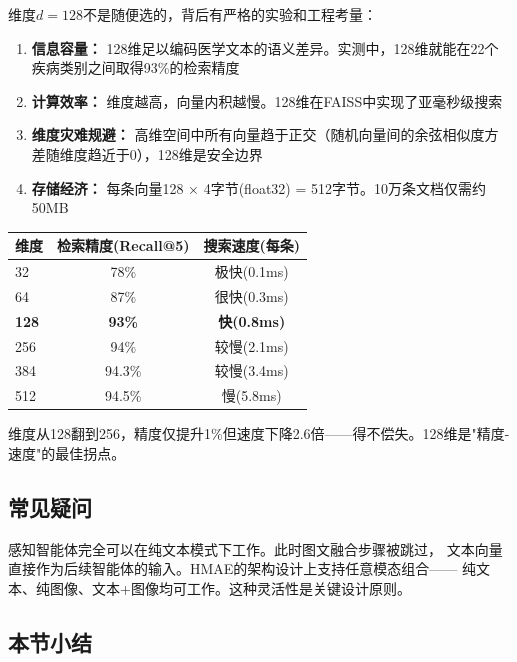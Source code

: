 \documentclass[11pt,a4paper]{ctexart}
\begin{document}
维度$d=128$不是随便选的，背后有严格的实验和工程考量：

\begin{enumerate}[nosep]
\item \textbf{信息容量：} 128维足以编码医学文本的语义差异。实测中，128维就能在22个疾病类别之间取得93\%的检索精度
\item \textbf{计算效率：} 维度越高，向量内积越慢。128维在FAISS中实现了亚毫秒级搜索
\item \textbf{维度灾难规避：} 高维空间中所有向量趋于正交（随机向量间的余弦相似度方差随维度趋近于0），128维是安全边界
\item \textbf{存储经济：} 每条向量128 × 4字节(float32) = 512字节。10万条文档仅需约50MB
\end{enumerate}

\begin{exambox}[维度选择的实验依据]
\begin{tabular}{lcc}
\toprule
\textbf{维度} & \textbf{检索精度(Recall@5)} & \textbf{搜索速度(每条)} \\
\midrule
32 & 78\% & 极快(0.1ms) \\
64 & 87\% & 很快(0.3ms) \\
\textbf{128} & \textbf{93\%} & \textbf{快(0.8ms)} \\
256 & 94\% & 较慢(2.1ms) \\
384 & 94.3\% & 较慢(3.4ms) \\
512 & 94.5\% & 慢(5.8ms) \\
\bottomrule
\end{tabular}

维度从128翻到256，精度仅提升1\%但速度下降2.6倍——得不偿失。128维是"精度-速度"的最佳拐点。
\end{exambox}

\subsection{常见疑问}

\begin{warnbox}[如果输入只有文本没有图像怎么办？]
感知智能体完全可以在纯文本模式下工作。此时图文融合步骤被跳过，
文本向量直接作为后续智能体的输入。HMAE的架构设计上支持任意模态组合——
纯文本、纯图像、文本+图像均可工作。这种灵活性是关键设计原则。
\end{warnbox}

\subsection{本节小结}
\end{document}
